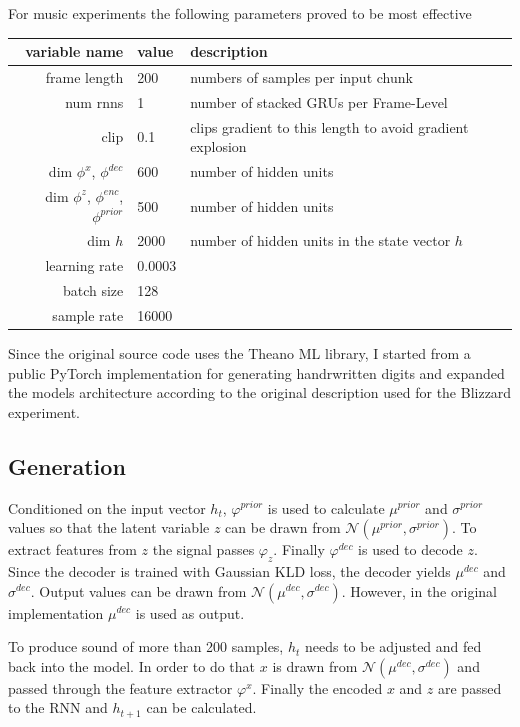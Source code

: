 \documentclass[12pt]{article}
\begin{document}
For music experiments the following parameters proved to be most effective
\begin{center}
\begin{tabular}{ r | l | l }
variable name & value & description \\
\hline
frame length & 200 & numbers of samples per input chunk\\
num rnns & 1 & number of stacked GRUs per Frame-Level \\
clip & 0.1 & clips gradient to this length to avoid gradient explosion \\
dim $\phi^x$, $\phi^{dec}$ & 600 & number of hidden units \\
dim $\phi^z$, $\phi^{enc}$, $\phi^{prior}$ & 500 & number of hidden units \\
dim $h$ & 2000 & number of hidden units in the state vector $h$ \\
learning rate & 0.0003 & \\
batch size & 128 & \\
sample rate & 16000 & \\
\end{tabular}
\end{center}


Since the original source code uses the Theano ML library, I started from a public PyTorch implementation \cite{VRNNgit} for generating handrwritten digits and expanded the models architecture according to the original description used for the Blizzard experiment.



\subsection{Generation}
Conditioned on the input vector $h_t$, $\varphi^{prior}$ is used to calculate $\mu^{prior}$ and $\sigma^{prior}$ values so that the latent variable $z$ can be drawn from $\mathcal{N}(\mu^{prior}, \sigma^{prior})$.
To extract features from $z$ the signal passes $\varphi_z$.
Finally $\varphi^{dec}$ is used to decode $z$.
Since the decoder is trained with Gaussian KLD loss, the decoder yields $\mu^{dec}$ and $\sigma^{dec}$.
Output values can be drawn from $\mathcal{N}(\mu^{dec}, \sigma^{dec})$.
However, in the original implementation $\mu^{dec}$ is used as output.

To produce sound of more than 200 samples, $h_t$ needs to be adjusted and fed back into the model.
In order to do that $x$ is drawn from $\mathcal{N}(\mu^{dec}, \sigma^{dec})$ and passed through the feature extractor $\varphi^x$.
Finally the encoded $x$ and $z$ are passed to the RNN and $h_{t+1}$ can be calculated.
\end{document}
